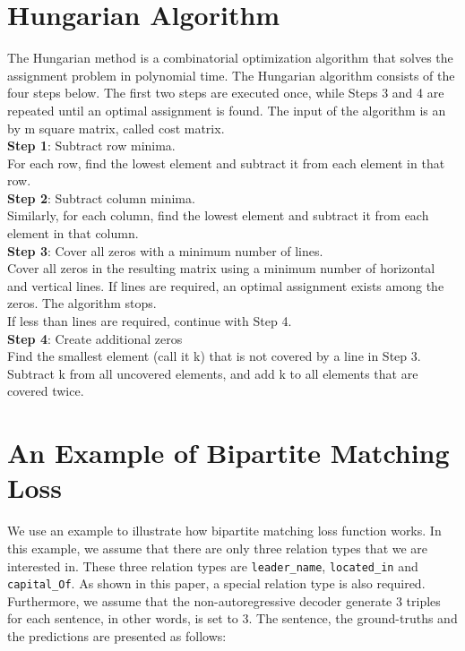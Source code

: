 \documentclass[letterpaper]{article} \usepackage{aaai21}  \usepackage{times}  \usepackage{helvet} \usepackage{courier}  \usepackage[hyphens]{url}  \usepackage{graphicx} \usepackage{amsfonts,amssymb}
\begin{document}



\section{Hungarian Algorithm}

The Hungarian method is a combinatorial optimization algorithm that solves the assignment problem in polynomial time. The Hungarian algorithm consists of the four steps below. The first two steps are executed once, while Steps 3 and 4 are repeated until an optimal assignment is found. The input of the algorithm is an  by m square matrix, called cost matrix.
\\

\noindent \textbf{Step 1}: Subtract row minima. \\

\noindent For each row, find the lowest element and subtract it from each element in that row.\\

\noindent \textbf{Step 2}: Subtract column minima.  \\

\noindent Similarly, for each column, find the lowest element and subtract it from each element in that column. \\

\noindent \textbf{Step 3}: Cover all zeros with a minimum number of lines.\\

\noindent Cover all zeros in the resulting matrix using a minimum number of horizontal and vertical lines. If  lines are required, an optimal assignment exists among the zeros. The algorithm stops. \\

\noindent If less than  lines are required, continue with Step 4.\\

\noindent \textbf{Step 4}: Create additional zeros
\\

\noindent  Find the smallest element (call it k) that is not covered by a line in Step 3. Subtract k from all uncovered elements, and add k to all elements that are covered twice.

\section{An Example of Bipartite Matching Loss}
We use an example to illustrate how bipartite matching loss function works. In this example, we assume that there are only three relation types that we are interested in. These three relation types are \texttt{leader\_name}, \texttt{located\_in} and \texttt{capital\_Of}. As shown in this paper, a special relation type  is also required. Furthermore, we assume that the non-autoregressive decoder generate 3 triples for each sentence, in other words,  is set to 3. The sentence, the ground-truths 
and the predictions are presented as follows:
\end{document}

